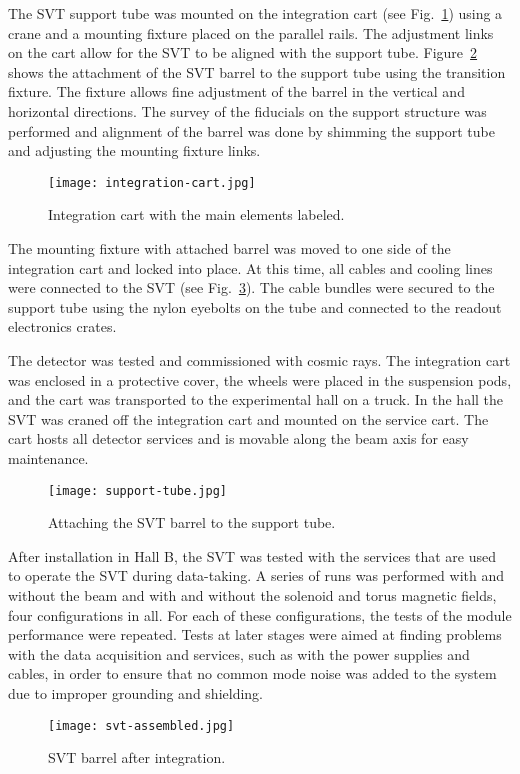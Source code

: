 The SVT support tube was mounted on the integration cart (see Fig.~\ref{fig:integration-cart}) using a crane and a mounting fixture placed on the parallel rails. The adjustment links on the cart allow for the SVT to be aligned with the support tube. Figure~\ref{fig:support-tube} shows the attachment of the SVT barrel to the support tube using the transition fixture. The fixture allows fine adjustment of the barrel in the vertical and horizontal directions. The survey of the fiducials on the support structure was performed and alignment of the barrel was done by shimming the support tube and adjusting the mounting fixture links. 

\begin{figure}[hbt] 
\centering 
\texttt{[image: integration-cart.jpg]}
\caption{Integration cart with the main elements labeled.}
\label{fig:integration-cart}
\end{figure}

The mounting fixture with attached barrel was moved to one side of the integration cart and locked into place. At this time, all cables and cooling lines were connected to the SVT (see Fig.~\ref{fig:svt-assembled}). The cable bundles were secured to the support tube using the nylon eyebolts on the tube and connected to the readout electronics crates. 

The detector was tested and commissioned with cosmic rays. The integration cart was enclosed in a protective cover, the wheels were placed in the suspension pods, and the cart was transported to the experimental hall on a truck. In the hall the SVT was craned off the integration cart and mounted on the service cart. The cart hosts all detector services and is movable along the beam axis for easy maintenance.

\begin{figure}[hbt] 
\centering 
\texttt{[image: support-tube.jpg]}
\caption{Attaching the SVT barrel to the support tube.}
\label{fig:support-tube}
\end{figure}

After installation in Hall B, the SVT was tested with the services that are used to operate the SVT during data-taking. A series of runs was performed with and without the beam and with and without the solenoid and torus magnetic fields, four configurations in all. For each of these configurations, the tests of the module performance were repeated. Tests at later stages were aimed at finding problems with the data acquisition and services, such as with the power supplies and cables, in order to ensure that no common mode noise was added to the system due to improper grounding and shielding. 

\begin{figure}[hbt] 
\centering 
\texttt{[image: svt-assembled.jpg]}
\caption{SVT barrel after integration.}
\label{fig:svt-assembled}
\end{figure}
